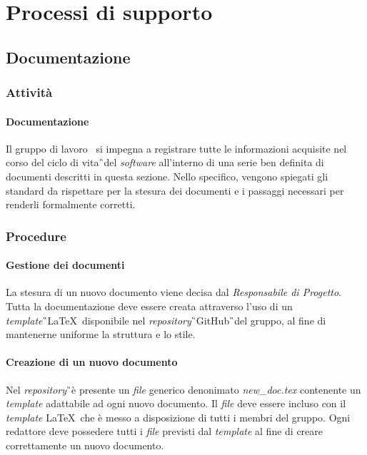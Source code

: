 \section{Processi di supporto}
\subsection{Documentazione}
\subsubsection{Attività}
\paragraph{Documentazione} 
Il gruppo di lavoro \GRUPPO\ si impegna a registrare tutte le informazioni acquisite nel corso del ciclo di vita\G\ del \textit{software} all'interno di una serie ben definita di documenti descritti in questa sezione. Nello specifico, vengono spiegati gli standard da rispettare per la stesura dei documenti e i passaggi necessari per renderli formalmente corretti.

\subsubsection{Procedure}
\paragraph{Gestione dei documenti}
La stesura di un nuovo documento viene decisa dal \textit{Responsabile di Progetto}. Tutta la documentazione deve essere creata attraverso l'uso di un \textit{template}\G\ \LaTeX\ disponibile nel \textit{repository}\G\ GitHub\G\ del gruppo, al fine di mantenerne uniforme la struttura e lo stile.

\paragraph{Creazione di un nuovo documento}
Nel \textit{repository}\G\ è presente un \textit{file} generico denonimato \textit{new\_doc.tex} contenente un \textit{template} adattabile ad ogni nuovo documento. Il \textit{file} deve essere incluso con il \textit{template} \LaTeX\, che è messo a disposizione di tutti i membri del gruppo. Ogni redattore deve possedere tutti i \textit{file} previsti dal \textit{template} al fine di creare correttamente un nuovo documento.

